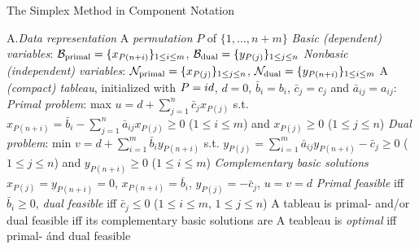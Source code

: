 \beginsection The Simplex Method in Component Notation

\item{A.}\emph{Data representation}\smallskip
{}A \emph{permutation} $P$ of $\{1,\ldots,n+m\}$\smallskip
{}\emph{Basic (dependent) variables}: ${\cal B}_{\rm primal}=\{
x_{P(n+i)}\}_{1\leq i\leq m}$, ${\cal B}_{\rm dual}=\{ y_{P(j)}\}_{1\leq j\leq
n}$\smallskip
{}\emph{Nonbasic (independent) variables}: ${\cal N}_{\rm primal}=\{
x_{P(j)}\}_{1\leq j\leq n}$, ${\cal N}_{\rm dual}=\{ y_{P(n+i)}\}_{1\leq i\leq
m}$\smallskip
{}A \emph{(compact) tableau}, initialized with $P={\sl id}$, $d=0$,
$\bar{b}_i=b_i$, $\bar{c}_j=c_j$ and $\bar{a}_{ij}=a_{ij}$:\smallskip
\iitem{}\vbox{\offinterlineskip
}\smallskip
{}\emph{Primal problem}: max $u=d+\sum_{j=1}^n\bar{c}_jx_{P(j)}$ s.t.
$x_{P(n+i)}=\bar{b}_i-\sum_{j=1}^n\bar{a}_{ij}x_{P(j)}\geq 0$ ($1\leq i\leq m$)
and $x_{P(j)}\geq 0$ ($1\leq j\leq n$)\smallskip
{}\emph{Dual problem}: min
$v=d+\sum_{i=1}^m\bar{b}_iy_{P(n+i)}$ s.t.
$y_{P(j)}=\sum_{i=1}^m\bar{a}_{ij}y_{P(n+i)}-\bar{c}_j\geq 0$ ($1\leq j\leq n$)
and $y_{P(n+i)}\geq 0$ ($1\leq i\leq m$)\smallskip
{}\emph{Complementary basic solutions} $x_{P(j)}=y_{P(n+i)}=0$,
$x_{P(n+i)}=\bar{b}_i$, $y_{P(j)}=-\bar{c}_j$, $u=v=d$
\smallskip
{}\emph{Primal feasible} iff $\bar{b}_i\geq 0$, \emph{dual feasible}
iff $\bar{c}_j\leq 0$ ($1\leq i\leq m$,  $1\leq j\leq n$)\smallskip
{}A tableau is primal- and/or dual feasible iff its complementary
basic solutions are\smallskip
{}A teableau is \emph{optimal} iff primal- \'and dual feasible
\smallskip

